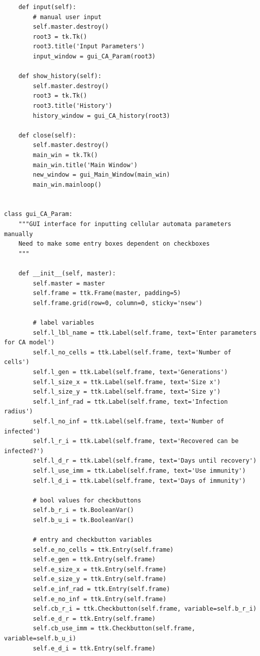 \documentclass[11pt, a4paper]{article}
\begin{document}
\begin{lstlisting}
    def input(self):
        # manual user input
        self.master.destroy()
        root3 = tk.Tk()
        root3.title('Input Parameters')
        input_window = gui_CA_Param(root3)

    def show_history(self):
        self.master.destroy()
        root3 = tk.Tk()
        root3.title('History')
        history_window = gui_CA_history(root3)

    def close(self):
        self.master.destroy()
        main_win = tk.Tk()
        main_win.title('Main Window')
        new_window = gui_Main_Window(main_win)
        main_win.mainloop()


class gui_CA_Param:
    """GUI interface for inputting cellular automata parameters manually
    Need to make some entry boxes dependent on checkboxes
    """

    def __init__(self, master):
        self.master = master
        self.frame = ttk.Frame(master, padding=5)
        self.frame.grid(row=0, column=0, sticky='nsew')

        # label variables
        self.l_lbl_name = ttk.Label(self.frame, text='Enter parameters for CA model')
        self.l_no_cells = ttk.Label(self.frame, text='Number of cells')
        self.l_gen = ttk.Label(self.frame, text='Generations')
        self.l_size_x = ttk.Label(self.frame, text='Size x')
        self.l_size_y = ttk.Label(self.frame, text='Size y')
        self.l_inf_rad = ttk.Label(self.frame, text='Infection radius')
        self.l_no_inf = ttk.Label(self.frame, text='Number of infected')
        self.l_r_i = ttk.Label(self.frame, text='Recovered can be infected?')
        self.l_d_r = ttk.Label(self.frame, text='Days until recovery')
        self.l_use_imm = ttk.Label(self.frame, text='Use immunity')
        self.l_d_i = ttk.Label(self.frame, text='Days of immunity')

        # bool values for checkbuttons
        self.b_r_i = tk.BooleanVar()
        self.b_u_i = tk.BooleanVar()

        # entry and checkbutton variables
        self.e_no_cells = ttk.Entry(self.frame)
        self.e_gen = ttk.Entry(self.frame)
        self.e_size_x = ttk.Entry(self.frame)
        self.e_size_y = ttk.Entry(self.frame)
        self.e_inf_rad = ttk.Entry(self.frame)
        self.e_no_inf = ttk.Entry(self.frame)
        self.cb_r_i = ttk.Checkbutton(self.frame, variable=self.b_r_i)
        self.e_d_r = ttk.Entry(self.frame)
        self.cb_use_imm = ttk.Checkbutton(self.frame, variable=self.b_u_i)
        self.e_d_i = ttk.Entry(self.frame)


\end{lstlisting}
\end{document}
